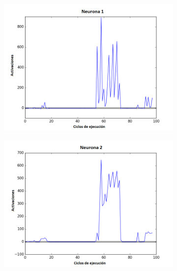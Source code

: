 \begin{figure}[!h]
    \centering %
\begin{subfigure}{0.33\textwidth}
  \includegraphics[width=\linewidth]{Imagenes/Agente1Activaciones/Agente1/Neurona0}
\end{subfigure}\hfil %
\begin{subfigure}{0.33\textwidth}
  \includegraphics[width=\linewidth]{Imagenes/Agente1Activaciones/Agente1/Neurona1}
\end{subfigure}\hfil %
\begin{subfigure}{0.33\textwidth}

\end{subfigure}
\end{figure}
